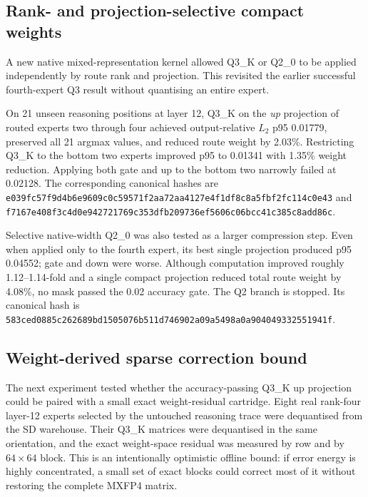 \subsection{Rank- and projection-selective compact weights}

A new native mixed-representation kernel allowed Q3\_K or Q2\_0 to be applied
independently by route rank and projection.  This revisited the earlier successful
fourth-expert Q3 result without quantising an entire expert.

On 21 unseen reasoning positions at layer 12, Q3\_K on the \emph{up} projection
of routed experts two through four achieved output-relative $L_2$ p95 0.01779,
preserved all 21 argmax values, and reduced route weight by 2.03\%.  Restricting
Q3\_K to the bottom two experts improved p95 to 0.01341 with 1.35\% weight
reduction.  Applying both gate and up to the bottom two narrowly failed at
0.02128.  The corresponding canonical hashes are
\texttt{e039fc57f9d4b6e9609c0c59571f2aa7}\allowbreak\texttt{2aa4127e4f1df8c8a5fbf2fc114c0e43}
and
\texttt{f7167e408f3c4d0e942721769c353dfb}\allowbreak\texttt{209736ef5606c06bcc41c385c8add86c}.

Selective native-width Q2\_0 was also tested as a larger compression step.
Even when applied only to the fourth expert, its best single projection produced
p95 0.04552; gate and down were worse.  Although computation improved roughly
1.12--1.14-fold and a single compact projection reduced total route weight by
4.08\%, no mask passed the 0.02 accuracy gate.  The Q2 branch is stopped.  Its
canonical hash is
\texttt{583ced0885c262689bd1505076b511d74}\allowbreak\texttt{6902a09a5498a0a904049332551941f}.

\subsection{Weight-derived sparse correction bound}

The next experiment tested whether the accuracy-passing Q3\_K up projection
could be paired with a small exact weight-residual cartridge.  Eight real
rank-four layer-12 experts selected by the untouched reasoning trace were
dequantised from the SD warehouse.  Their Q3\_K matrices were dequantised in
the same orientation, and the exact weight-space residual was measured by row
and by $64\times64$ block.  This is an intentionally optimistic offline bound:
if error energy is highly concentrated, a small set of exact blocks could
correct most of it without restoring the complete MXFP4 matrix.

